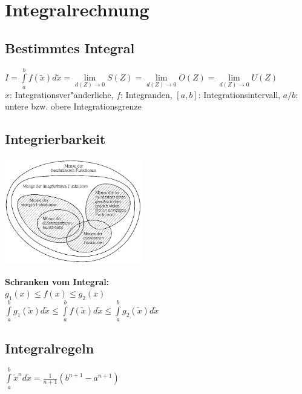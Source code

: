 \section{Integralrechnung}

\subsection{Bestimmtes Integral}
  $I = \int\limits_{a}^{b}{f(\widetilde{x})}d\widetilde{x} = \lim\limits_{d(Z) \rightarrow 0}S(Z) = \lim\limits_{d(Z) \rightarrow 0}O(Z)  = \lim\limits_{d(Z) \rightarrow 0}U(Z)  $ \\ 
	$x$: Integrationsver"anderliche, $f$: Integranden, $[a,b]$: Integrationsintervall, $a/b$: untere bzw. obere Integrationsgrenze

\subsection{Integrierbarkeit}
	\begin{minipage}[c]{10cm}
		\begin{center}
			\includegraphics[width=6cm]{./bilder/integral_mengen.png} 
		\end{center}
	\end{minipage}
	\begin{minipage}[c]{7cm}
		\textbf{Schranken vom Integral:}\\
		$g_1(x) \leq f(x) \leq g_2(x)$\\
		$\int\limits_{a}^{b} g_1(\widetilde{x}) d\widetilde{x} \leq \int\limits_{a}^{b} f(\widetilde{x}) d\widetilde{x} \leq \int\limits_{a}^{b} g_2(\widetilde{x}) d\widetilde{x}$
	\end{minipage}
	
\subsection{Integralregeln}
	$\int\limits_a^b \widetilde{x}^n d\widetilde{x}=\frac{1}{n+1}(b^{n+1}-a^{n+1})$
	
